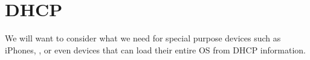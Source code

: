 \documentclass[dvipsnames]{article}
\begin{document}
\section{DHCP}
\label{sec:dhcp}

We will want to consider what we need for special purpose devices such as
iPhones, , or even  devices that can load their entire OS from DHCP
information.
\end{document}
